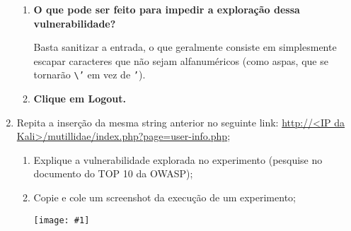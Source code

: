 \documentclass{article}
\newcommand{\code}[1]{\texttt{#1}}
\newcommand{\img}[1]{%
    \texttt{[image: \#1]}
}
\begin{document}
\begin{enumerate}
\begin{enumerate}
                \item \textbf{O que pode ser feito para impedir a exploração
                    dessa vulnerabilidade?}

                    Basta sanitizar a entrada, o que geralmente consiste em
                    simplesmente escapar caracteres que não sejam alfanuméricos
                    (como aspas, que se tornarão \code{\textbackslash'} em vez
                    de \code{'}).

                \item \textbf{Clique em Logout.}
            \end{enumerate}
        \item Repita a inserção da mesma string anterior no seguinte link:
            \url{http://<IP da Kali>/mutillidae/index.php?page=user-info.php};
            \begin{enumerate}
                \item Explique a vulnerabilidade explorada no experimento
                    (pesquise no documento do TOP 10 da OWASP);
                \item Copie e cole um screenshot da execução de um
                    experimento;

                    \img{imgs/q2_3}


\end{enumerate}
\end{enumerate}
\end{document}
